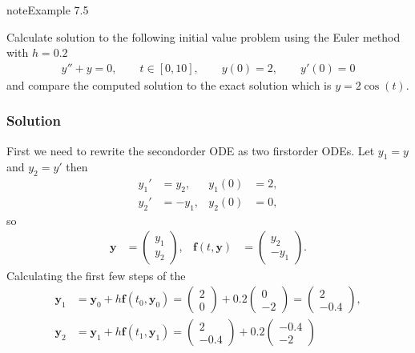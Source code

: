 \documentclass[letterpaper,10pt,english]{jupyterBook}
\begin{document}
\begin{sphinxadmonition}{note}{Example 7.5}

\sphinxAtStartPar
Calculate solution to the following initial value problem using the Euler method with \(h=0.2\)
\begin{align*}
    y'' + y = 0, \qquad t \in [0,10], \qquad y(0) = 2, \qquad y'(0) = 0
\end{align*}
\sphinxAtStartPar
and compare the computed solution to the exact solution which is \(y = 2\cos(t)\).
\subsubsection*{Solution}

\sphinxAtStartPar
First we need to rewrite the second\sphinxhyphen{}order ODE as two first\sphinxhyphen{}order ODEs. Let \(y_1 = y\) and \(y_2 = y'\) then
\begin{align*}
    y_1' &= y_2, & y_1(0) &= 2,\\
    y_2' &= -y_1, & y_2(0) &= 0,
\end{align*}
\sphinxAtStartPar
so
\begin{align*}
    \mathbf{y} &= \begin{pmatrix} y_1 \\ y_2 \end{pmatrix}, &
    \mathbf{f}(t, \mathbf{y}) &= \begin{pmatrix} y_2 \\ -y_1 \end{pmatrix}.
\end{align*}
\sphinxAtStartPar
Calculating the first few steps of the {\hyperref[\detokenize{1_IVPs/1.2_Euler_Method:euler-method-definition}]{}}
\begin{align*}
    \mathbf{y}_1 &= \mathbf{y}_0 + h \mathbf{f}(t_0, \mathbf{y}_0) 
    = \begin{pmatrix} 2 \\ 0 \end{pmatrix} + 0.2 \begin{pmatrix} 0 \\ -2 \end{pmatrix}
    = \begin{pmatrix} 2 \\ -0.4 \end{pmatrix}, \\
    \mathbf{y}_2 &= \mathbf{y}_1 + h \mathbf{f}(t_1, \mathbf{y}_1) 
    = \begin{pmatrix} 2 \\ -0.4 \end{pmatrix} + 0.2\begin{pmatrix} -0.4 \\ -2 \end{pmatrix}

\end{align*}
\end{sphinxadmonition}
\end{document}
